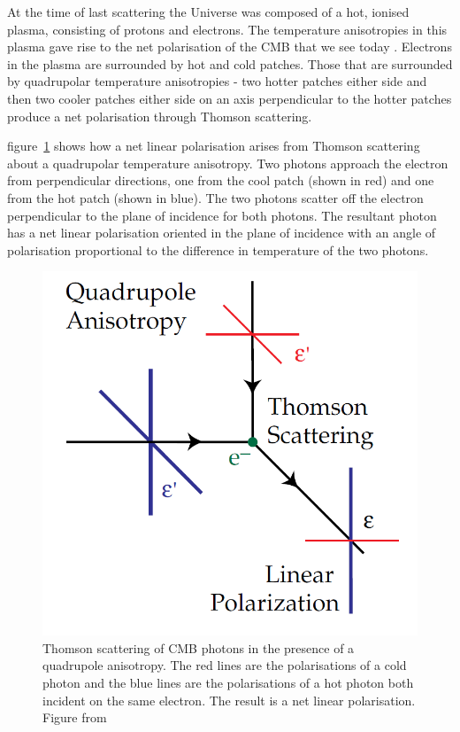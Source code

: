 At the time of last scattering the Universe was composed of a hot, ionised plasma, consisting of protons and electrons. The temperature anisotropies in this plasma gave rise to the net polarisation of the CMB that we see today \citep{Hu:1997hv}.
Electrons in the plasma are surrounded by hot and cold patches. Those that are surrounded by quadrupolar temperature anisotropies - two hotter patches either side and then two cooler patches either side on an axis perpendicular to the hotter patches produce a net polarisation through Thomson scattering.

figure~\ref{fig:thomson} shows how a net linear polarisation arises from Thomson scattering about a quadrupolar temperature anisotropy. Two photons approach the electron from perpendicular directions, one from the cool patch (shown in red) and one from the hot patch (shown in blue). The two photons scatter off the electron perpendicular to the plane of incidence for both photons. The resultant photon has a net linear polarisation oriented in the plane of incidence with an angle of polarisation proportional to the difference in temperature of the two photons. 

\begin{figure}[h]
\centering
\includegraphics[scale=0.35]{images/thomson.png}
\caption{Thomson scattering of CMB photons in the presence of a quadrupole anisotropy. The red lines are the polarisations of a cold photon and the blue lines are the polarisations of a hot photon both incident on the same electron. The result is a net linear polarisation. Figure from \citet{Hu:1997hv}}
\label{fig:thomson}
\end{figure}

